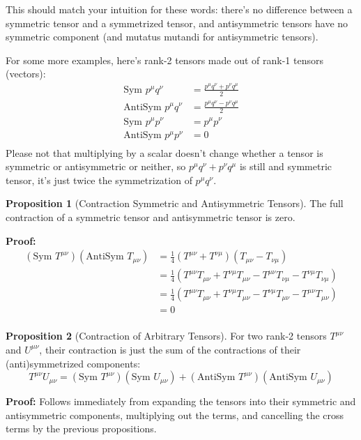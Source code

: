 \documentclass[12pt]{article}
\theoremstyle{definition}
\newtheorem{prop}{Proposition}[section]
\newcommand{\sym}{\text{Sym }}
\newcommand{\antisym}{\text{AntiSym }}
\begin{document}
This should match your intuition for these words: there's no difference between a symmetric tensor and a
symmetrized tensor, and antisymmetric tensors have no symmetric component (and mutatus mutandi for 
antisymmetric tensors).

For some more examples, here's rank-2 tensors made out of rank-1 tensors (vectors):
\begin{equation*}
\begin{split}
    \sym p^\mu q^\nu &= \frac{p^\mu q^\nu + p^\nu q^\mu}{2} \\
    \antisym p^\mu q^\nu &= \frac{p^\mu q^\nu - p^\nu q^\mu}{2} \\
    \sym p^\mu p^\nu &= p^\mu p^\nu \\
    \antisym p^\mu p^\nu &= 0 \\
\end{split}
\end{equation*}
Please not that multiplying by a scalar doesn't change whether a tensor is symmetric or antisymmetric
or neither, so $p^\mu q^\nu + p^\nu q^\mu$ is still and symmetric tensor, it's just twice the symmetrization
of $p^\mu q^\nu$. 

\begin{prop}[Contraction Symmetric and Antisymmetric Tensors]
    The full contraction of a symmetric tensor and antisymmetric tensor is zero.
\end{prop}

\textbf{Proof:}
\begin{equation*}
\begin{split}
    (\sym T^{\mu\nu}) (\antisym T_{\mu\nu})
        &= \frac{1}{4} \left( T^{\mu\nu} + T^{\nu\mu} \right) \left( T_{\mu\nu} - T_{\nu\mu} \right) \\
        &= \frac{1}{4} \left( T^{\mu\nu} T_{\mu\nu} + T^{\nu\mu} T_{\mu\nu} - T^{\mu\nu} T_{\nu\mu} - T^{\nu\mu} T_{\nu\mu} \right) \\
        &= \frac{1}{4} \left( T^{\mu\nu} T_{\mu\nu} + T^{\nu\mu} T_{\mu\nu} - T^{\nu\mu} T_{\mu\nu} - T^{\mu\nu} T_{\mu\nu} \right) \\
        &= 0 \\
\end{split}
\end{equation*}

\begin{prop}[Contraction of Arbitrary Tensors]
    For two rank-2 tensors $T^{\mu\nu}$ and $U^{\mu\nu}$, their contraction is just the sum of the
    contractions of their (anti)symmetrized components:
    \begin{equation*}
        T^{\mu\nu} U_{\mu\nu} = (\sym T^{\mu\nu})(\sym U_{\mu\nu}) + (\antisym T^{\mu\nu})(\antisym U_{\mu\nu})
    \end{equation*}
\end{prop}
\textbf{Proof:} Follows immediately from expanding the tensors into their symmetric and antisymmetric
components, multiplying out the terms, and cancelling the cross terms by the previous propositions.
\end{document}
